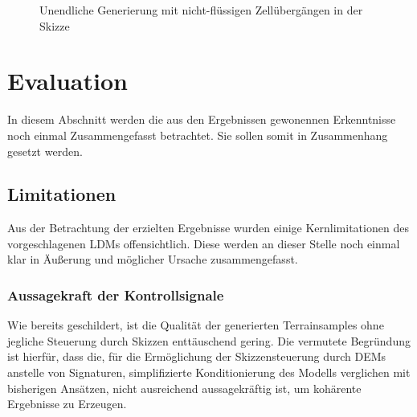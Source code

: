 \begin{figure}[htbp]
    \centering

    \vspace{-8pt}

    \caption{Unendliche Generierung mit nicht-flüssigen Zellübergängen in der Skizze}
    \label{fig:disconnected}
\end{figure}


\section{Evaluation}

In diesem Abschnitt werden die aus den Ergebnissen gewonennen Erkenntnisse noch einmal Zusammengefasst betrachtet. Sie sollen somit in Zusammenhang gesetzt werden.  

\subsection{Limitationen}

Aus der Betrachtung der erzielten Ergebnisse wurden einige Kernlimitationen des vorgeschlagenen \ac{LDM}s offensichtlich. Diese werden an dieser Stelle noch einmal klar in Äußerung und möglicher Ursache zusammengefasst.

\subsubsection{Aussagekraft der Kontrollsignale}

Wie bereits geschildert, ist die Qualität der generierten Terrainsamples ohne jegliche Steuerung durch Skizzen enttäuschend gering. Die vermutete Begründung ist hierfür, dass die, für die Ermöglichung der Skizzensteuerung durch \ac{DEM}s anstelle von Signaturen, simplifizierte Konditionierung des Modells verglichen mit bisherigen Ansätzen, nicht ausreichend aussagekräftig ist, um kohärente Ergebnisse zu Erzeugen. 

